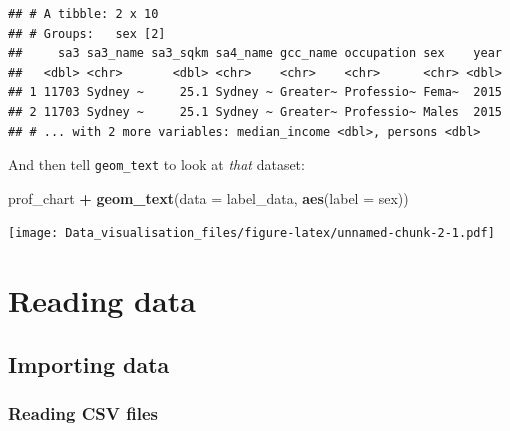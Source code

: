 \documentclass[]{book}
\newenvironment{Shaded}{\begin{snugshade}}{\end{snugshade}}
\newcommand{\DataTypeTok}[1]{\textcolor[rgb]{0.13,0.29,0.53}{#1}}
\newcommand{\KeywordTok}[1]{\textcolor[rgb]{0.13,0.29,0.53}{\textbf{#1}}}
\newcommand{\NormalTok}[1]{#1}
\newcommand{\OperatorTok}[1]{\textcolor[rgb]{0.81,0.36,0.00}{\textbf{#1}}}
\newcommand{\StringTok}[1]{\textcolor[rgb]{0.31,0.60,0.02}{#1}}
\begin{document}
\begin{Shaded}
\end{Shaded}

\begin{verbatim}
## # A tibble: 2 x 10
## # Groups:   sex [2]
##     sa3 sa3_name sa3_sqkm sa4_name gcc_name occupation sex    year
##   <dbl> <chr>       <dbl> <chr>    <chr>    <chr>      <chr> <dbl>
## 1 11703 Sydney ~     25.1 Sydney ~ Greater~ Professio~ Fema~  2015
## 2 11703 Sydney ~     25.1 Sydney ~ Greater~ Professio~ Males  2015
## # ... with 2 more variables: median_income <dbl>, persons <dbl>
\end{verbatim}

And then tell \texttt{geom\_text} to look at \emph{that} dataset:

\begin{Shaded}
\begin{Highlighting}[]
\NormalTok{prof_chart }\OperatorTok{+}
\StringTok{  }\KeywordTok{geom_text}\NormalTok{(}\DataTypeTok{data =}\NormalTok{ label_data,}
            \KeywordTok{aes}\NormalTok{(}\DataTypeTok{label =}\NormalTok{ sex))}
\end{Highlighting}
\end{Shaded}

\texttt{[image: Data\_visualisation\_files/figure-latex/unnamed-chunk-2-1.pdf]}

\hypertarget{reading-data}{%
\chapter{Reading data}\label{reading-data}}

\hypertarget{importing-data}{%
\section{Importing data}\label{importing-data}}

\hypertarget{reading-csv-files}{%
\subsection{Reading CSV files}\label{reading-csv-files}}
\end{document}
